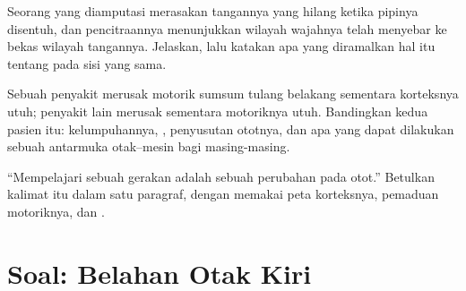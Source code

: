 \begin{exercise}[$\star\star\star$]\label{exo:g12:brain-and-movement:13}
Seorang yang diamputasi merasakan tangannya yang hilang ketika pipinya
disentuh, dan pencitraannya menunjukkan wilayah wajahnya telah menyebar
ke bekas wilayah tangannya. Jelaskan, lalu katakan apa yang diramalkan
hal itu tentang  pada sisi yang sama.
\end{exercise}

\begin{exercise}[$\star\star\star$]\label{exo:g12:brain-and-movement:14}
Sebuah penyakit merusak  motorik sumsum tulang belakang sementara
korteksnya utuh; penyakit lain merusak  sementara
 motoriknya utuh. Bandingkan kedua pasien itu: kelumpuhannya,
, penyusutan ototnya, dan apa yang dapat dilakukan sebuah
antarmuka otak--mesin bagi masing-masing.
\end{exercise}

\begin{exercise}[$\star\star\star$]\label{exo:g12:brain-and-movement:15}
``Mempelajari sebuah gerakan adalah sebuah perubahan pada otot.''
Betulkan kalimat itu dalam satu paragraf, dengan memakai peta
korteksnya, pemaduan  motoriknya, dan .
\end{exercise}

\section{Soal: Belahan Otak Kiri}

